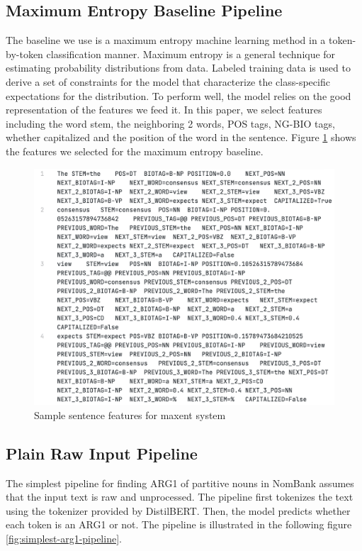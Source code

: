 \documentclass[11pt]{article}
\begin{document}
\subsection{Maximum Entropy Baseline Pipeline}

The baseline we use is a maximum entropy machine learning method in a token-by-token classification manner. Maximum entropy is a general technique for estimating probability distributions from data. Labeled training data
is used to derive a set of constraints for the model that
characterize the class-specific expectations for the distribution. To perform well, the model relies on the good representation of the features we feed it. In this paper, we select features including the word stem, the neighboring 2 words, POS tags, NG-BIO tags, whether capitalized and the position of the word in the sentence. Figure \ref{fig:maxent-feature-sample} shows the features we selected for the maximum entropy baseline.

\begin{figure}[h]
  \centering
  \includegraphics[width=\linewidth]{assets/maxent-feature-sample.png}
  \caption{Sample sentence features for maxent system}
  \label{fig:maxent-feature-sample}
\end{figure}

\subsection{Plain Raw Input Pipeline}
\label{section:plain-pipeline}

The simplest pipeline for finding ARG1 of partitive nouns in NomBank assumes that the input text is raw and unprocessed. The pipeline first tokenizes the text using the tokenizer provided by DistilBERT. Then, the model predicts whether each token is an ARG1 or not. The pipeline is illustrated in the following figure \ref{fig:simplest-arg1-pipeline}.
\end{document}
